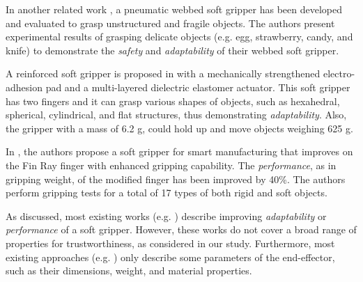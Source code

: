 \documentclass[lettersize,journal]{IEEEtran}
\begin{document}
In another related work \cite{Cai2021}, a pneumatic webbed soft gripper has been developed and evaluated to grasp unstructured and fragile objects. 
The authors present experimental results of grasping delicate objects (e.g. egg, strawberry, candy, and knife) to demonstrate the \emph{safety} and \emph{adaptability} of their webbed soft gripper. %

A reinforced soft gripper is proposed in \cite{Hwang2020} with a mechanically strengthened electro-adhesion pad and a multi-layered dielectric elastomer actuator. This soft gripper has two fingers and it can grasp various shapes of objects, such as hexahedral, spherical, cylindrical, and flat structures, thus demonstrating \emph{adaptability}. Also, the gripper with a mass of 6.2 g, could hold up and move objects weighing 625 g. 

In \cite{Shin2021}, the authors propose a soft gripper for smart manufacturing that improves on the Fin Ray finger with enhanced gripping capability. The \emph{performance}, as in gripping weight, of the modified finger has been improved by 40\%. The authors perform gripping tests for a total of 17 types of both rigid and soft objects.

As discussed, most existing works (e.g. \cite{Cheng2021,Liu2021,Chen2018,Cai2021,Hwang2020,Shin2021}) describe improving \emph{adaptability} or \emph{performance} of a soft gripper. However, these works do not cover a broad range of properties for trustworthiness, as considered in our study. %
Furthermore, most existing approaches (e.g. \cite{Hong2022,Bhattacharya2019,Tadakuma2020,Loh2014,Nishikawa2019,Mohan2020}) only describe some parameters of the end-effector, such as their dimensions, weight, and material properties.%
\end{document}
